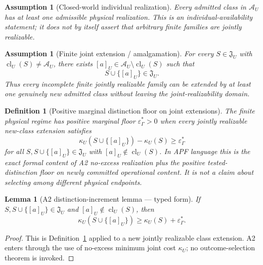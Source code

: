 \documentclass[11pt]{article}
\newtheorem{lemma}[theorem]{Lemma}
\newtheorem{definition}[theorem]{Definition}
\newtheorem{assumption}[theorem]{Assumption}
\theoremstyle{remark}
\newcommand{\G}{\Gamma}
\newcommand{\floor}{\varepsilon^{\!*}_{\G}}
\begin{document}
\begin{assumption}[Closed-world individual realization]
\label{ass:closed-world-distinction-realization}
Every admitted class in $\mathcal A_U$ has at least one admissible physical
realization.  This is an individual-availability statement; it does not by
itself assert that arbitrary finite families are jointly realizable.
\end{assumption}

\begin{assumption}[Finite joint extension / amalgamation]
\label{ass:finite-joint-extension}
For every $S\in\mathfrak J_U$ with
$\operatorname{cl}_U(S)\neq\mathcal A_U$, there exists
$[a]_U\in\mathcal A_U\setminus\operatorname{cl}_U(S)$ such that
\[
  S\cup\{[a]_U\}\in\mathfrak J_U.
\]
Thus every incomplete finite jointly realizable family can be extended by at
least one genuinely new admitted class without leaving the joint-realizability
domain.
\end{assumption}

\begin{definition}[Positive marginal distinction floor on joint extensions]
\label{def:positive-joint-extension-floor}
The finite physical regime has positive marginal floor $\floor>0$ when every
jointly realizable new-class extension satisfies
\[
  \kappa_U\!\left(S\cup\{[a]_U\}\right)-\kappa_U(S)
  \ge \floor
\]
for all $S,S\cup\{[a]_U\}\in\mathfrak J_U$ with
$[a]_U\notin\operatorname{cl}_U(S)$.
In APF language this is the exact formal content of A2 no-excess realization
plus the positive tested-distinction floor on newly committed operational
content.  It is not a claim about selecting among different physical
endpoints.
\end{definition}

\begin{lemma}[A2 distinction-increment lemma --- typed form]
\label{lem:a2-distinction-increment}
If $S,S\cup\{[a]_U\}\in\mathfrak J_U$ and
$[a]_U\notin\operatorname{cl}_U(S)$, then
\[
  \kappa_U\!\left(S\cup\{[a]_U\}\right)
  \ge \kappa_U(S)+\floor.
\]
\end{lemma}

\begin{proof}
This is Definition~\ref{def:positive-joint-extension-floor} applied to a new
jointly realizable class extension.  A2 enters through the use of no-excess
minimum joint cost $\kappa_U$; no outcome-selection theorem is invoked.
\end{proof}
\end{document}
